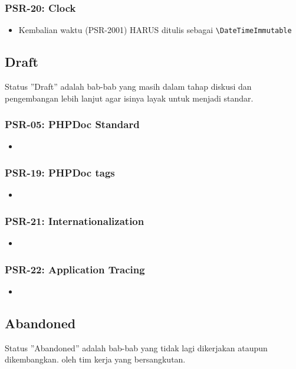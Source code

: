 \subsubsection{PSR-20: Clock}
\label{subsubsec:psr20}
\begin{itemize}
	\item Kembalian waktu (PSR-2001) HARUS ditulis sebagai \verb|\DateTimeImmutable|    
\end{itemize}

\subsection{Draft}
\label{subsec:draft}
Status ''Draft'' adalah bab-bab yang masih dalam tahap diskusi dan pengembangan lebih lanjut agar isinya layak untuk menjadi standar.

\subsubsection{PSR-05: PHPDoc Standard}
\label{subsubsec:psr05}
\begin{itemize}
	\item
\end{itemize}

\subsubsection{PSR-19: PHPDoc tags}
\label{subsubsec:psr19}
\begin{itemize}
	\item
\end{itemize}

\subsubsection{PSR-21: Internationalization}
\label{subsubsec:psr21}
\begin{itemize}
	\item
\end{itemize}

\subsubsection{PSR-22: Application Tracing}
\label{subsubsec:psr22}
\begin{itemize}
	\item
\end{itemize}


\subsection{Abandoned}
\label{subsec:abandoned}
Status ''Abandoned'' adalah bab-bab yang tidak lagi dikerjakan ataupun dikembangkan. oleh tim kerja yang bersangkutan. 

